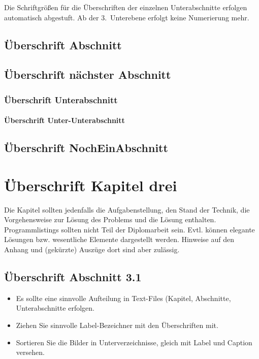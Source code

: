 \documentclass[11pt]{report}
\begin{document}
Die Schriftgr\"{o}{\ss}en f\"{u}r die \"{U}berschriften der einzelnen 
Unterabschnitte erfolgen automatisch abgestuft.  
Ab der 3.~Unterebene erfolgt keine
Numerierung mehr.

%
  \section{\"{U}berschrift Abschnitt}
%  
  \section{\"{U}berschrift n\"{a}chster Abschnitt}
%  
  \subsection{\"{U}berschrift Unterabschnitt}
  \subsubsection{\"{U}berschrift Unter-Unterabschnitt}
  \section{\"{U}berschrift NochEinAbschnitt}
    \label{kap:WichtigerAbschnitt}


\chapter{\"{U}berschrift Kapitel drei}
\label{kap:LabelKapitelDrei} Die Kapitel sollten jedenfalls die
Aufgabenstellung, den Stand der Technik, die Vorgehensweise zur
L\"{o}sung des Problems und die L\"{o}sung enthalten. Programmlistings
sollten nicht Teil der Diplomarbeit sein. Evtl. k\"{o}nnen elegante
L\"{o}sungen bzw. wesentliche Elemente dargestellt werden. Hinweise
auf den Anhang und (gek\"{u}rzte) Ausz\"{u}ge dort sind aber zul\"{a}ssig.
\section{\"{U}berschrift Abschnitt 3.1}

\begin{itemize}
\item Es sollte eine sinnvolle Aufteilung in Text-Files
(Kapitel, Abschnitte, Unterabschnitte erfolgen.
\item Ziehen Sie sinnvolle Label-Bezeichner mit den \"{U}berschriften 
mit.
\item Sortieren Sie die Bilder in Unterverzeichnisse,
gleich mit Label und Caption versehen.
\end{itemize}
\end{document}
